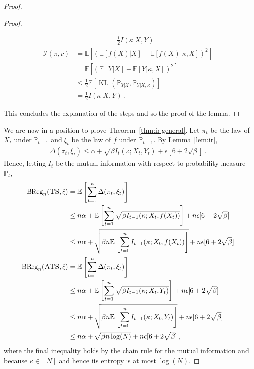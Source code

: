 \documentclass[letter, 12pt]{report}
\newcommand{\BReg}{\textrm{BReg}}
\newcommand{\KL}{\operatorname{KL}}
\newcommand{\E}{\mathbb E}
\newcommand{\bbP}{\mathbb P}
\newcommand{\I}{\mathcal{I}}
\newcommand{\1}{\mathbf{1}}
\newcommand{\ts}{\textsc{TS}\xspace}
\newcommand{\ats}{\textsc{ATS}}
\theoremstyle{plain}
\theoremstyle{definition}
\theoremstyle{remark}
\begin{document}
\begin{proof}
\begin{proof}
\begin{enumerate}
\begin{align*}
                       & = \frac{1}{2} I(\kappa | X, Y)
                  \end{align*}
                  \begin{align*}
                      \I(\pi, \nu)
                       & = \E[(\E[f(X)|X] - \E[f(X)|\kappa,X])^2]                 \\
                       & = \E[(\E[Y|X] - \E[Y|\kappa,X])^2]                       \\
                       & \leq \frac{1}{2} \E[ \KL(\bbP_{Y|X}, \bbP_{Y|X,\kappa})] \\
                       & = \frac{1}{2} I(\kappa | X, Y) \,.
                  \end{align*}
        \end{enumerate}
        This concludes the explanation of the steps and so the proof of the lemma.
    \end{proof}

    We are now in a position to prove Theorem~\ref{thm:ir-general}.
    Let $\pi_t$ be the law of $X_t$ under $\bbP_{t-1}$ and $\xi_t$ be the law of $f$ under $\bbP_{t-1}$.
    By Lemma~\ref{lem:ir},
    \begin{align*}
        \Delta(\pi_t, \xi_t) \leq \alpha + \sqrt{\beta I_t(\kappa ; X_t, Y_t)} + \epsilon[6 + 2 \sqrt{\beta}]\,.
    \end{align*}
    Hence, letting $I_t$ be the mutual information with respect to probability measure $\bbP_t$,
    \begin{align*}
        \BReg_n(\ts, \xi)
         & = \E\left[\sum_{t=1}^n \Delta(\pi_t, \xi_t)\right]                                                                         \\
         & \leq n \alpha + \E\left[\sum_{t=1}^n \sqrt{\beta I_{t-1}(\kappa ; X_t, f(X_t))}\right] + n \epsilon[6 + 2 \sqrt{\beta}]    \\
         & \leq n \alpha + \sqrt{\beta n \E\left[\sum_{t=1}^n I_{t-1}(\kappa ; X_t, f(X_t))\right]} + n \epsilon [6 + 2 \sqrt{\beta}] \\
        \BReg_n(\ats, \xi)
         & = \E\left[\sum_{t=1}^n \Delta(\pi_t, \xi_t)\right]                                                                         \\
         & \leq n \alpha + \E\left[\sum_{t=1}^n \sqrt{\beta I_{t-1}(\kappa ; X_t, Y_t)}\right] + n \epsilon[6 + 2 \sqrt{\beta}]       \\
         & \leq n \alpha + \sqrt{\beta n \E\left[\sum_{t=1}^n I_{t-1}(\kappa ; X_t, Y_t)\right]} + n \epsilon [6 + 2 \sqrt{\beta}]    \\
         & \leq n \alpha + \sqrt{\beta n \log(N)} + n \epsilon [6 + 2 \sqrt{\beta}] \,,
    \end{align*}
    where the final inequality holds by the chain rule for the mutual information and because $\kappa \in [N]$ and hence its entropy is at most $\log(N)$.
\end{proof}
\end{document}
